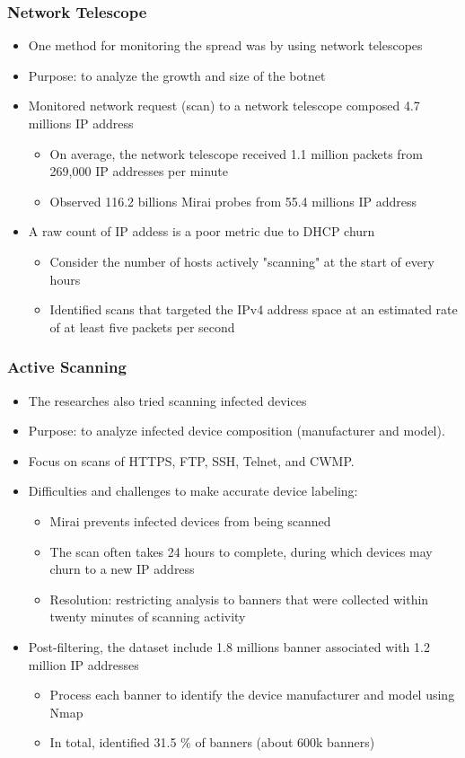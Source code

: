 \documentclass{beamer}
\begin{document}
\begin{frame}
	\frametitle{Network Telescope}
	\begin{itemize}
		\item One method for monitoring the spread was by using network telescopes
		\item Purpose: to analyze the growth and size of the botnet
		\item Monitored network request (scan) to a network telescope composed 4.7 millions IP address
		\begin{itemize}
			\item On average, the network telescope received 1.1 million packets from 269,000 IP addresses per minute 
			\item Observed 116.2 billions Mirai probes from 55.4 millions IP address
		\end{itemize}
		\item A raw count of IP addess is a poor metric due to DHCP churn
		\begin{itemize}
			\item Consider the number of hosts actively "scanning" at the start of every hours
			\item Identified scans that targeted the IPv4 address space at an estimated rate of at least five packets per second
		\end{itemize}
	\end{itemize}
\end{frame}

\begin{frame}
	\frametitle{Active Scanning}
	\begin{itemize}
		\item The researches also tried scanning infected devices
		\item Purpose: to analyze infected device composition (manufacturer and model).
		\item Focus on scans of HTTPS, FTP, SSH, Telnet, and CWMP.
		\item Difficulties and challenges to make accurate device labeling:		
		\begin{itemize}
			\item Mirai prevents infected devices from being scanned
			\item The scan often takes 24 hours to complete, during which devices may churn to a new IP address
			\item Resolution: restricting analysis to banners that were collected within twenty minutes of scanning activity
		\end{itemize}
		\item Post-filtering, the dataset include 1.8 millions banner associated with 1.2 million IP addresses
		\begin{itemize}
			\item Process each banner to identify the device manufacturer and model using Nmap
			\item In total, identified 31.5 \% of banners (about 600k banners)
		\end{itemize}
	\end{itemize}
\end{frame}
\end{document}
